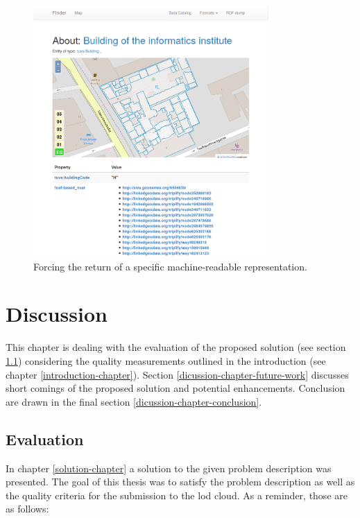 \documentclass[draft,final]{vutinfth} %
\begin{document}
\begin{figure}[h]
    \centering
    \includegraphics[width=0.8\textwidth]{graphics/solution/app/building_description.png}
    \caption{Forcing the return of a specific machine-readable representation.}
    \label{fig:solution-architectural-prototype:ld-publishing:force-machine-readable}
\end{figure}

\chapter{Discussion}
\label{discussion-chapter}

This chapter is dealing with the evaluation of the proposed solution (see section \ref{dicussion-chapter-evaluation}) considering the quality measurements outlined in the introduction (see chapter \ref{introduction-chapter}). Section \ref{dicussion-chapter-future-work} discusses short comings of the proposed solution and potential enhancements. Conclusion are drawn in the final section \ref{dicussion-chapter-conclusion}.

\section{Evaluation}
\label{dicussion-chapter-evaluation}
In chapter \ref{solution-chapter} a solution to the given problem description was presented. The goal of this thesis was to satisfy the problem description as well as the quality criteria for the submission to the \gls{lod} cloud. As a reminder, those are as follows\cite{cyganiak_linking_2011}:
\end{document}
